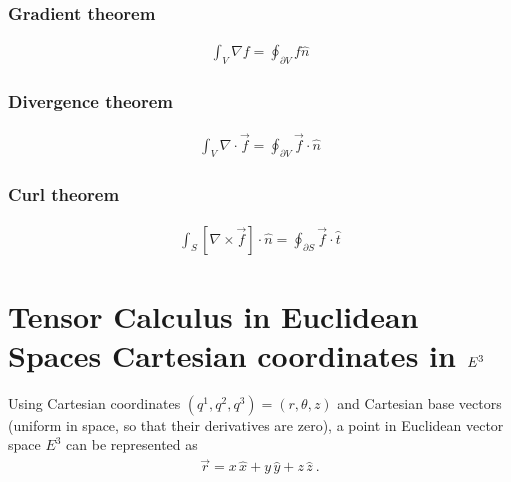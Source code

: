\documentclass[letterpaper,10pt,english]{jupyterBook}
\begin{document}
\subsubsection{Gradient theorem}
\label{\detokenize{ch/tensor-algebra-calculus/calculus-euclidean:gradient-theorem}}\label{\detokenize{ch/tensor-algebra-calculus/calculus-euclidean:tensor-calculus-integrals-theorems-gradient}}\begin{equation*}
\begin{split}\int_{V} \nabla f = \oint_{\partial V} f \hat{n}\end{split}
\end{equation*}

\subsubsection{Divergence theorem}
\label{\detokenize{ch/tensor-algebra-calculus/calculus-euclidean:divergence-theorem}}\label{\detokenize{ch/tensor-algebra-calculus/calculus-euclidean:tensor-calculus-integrals-theorems-divergence}}\begin{equation*}
\begin{split}\int_{V} \nabla \cdot \vec{f} = \oint_{\partial V} \vec{f} \cdot \hat{n}\end{split}
\end{equation*}

\subsubsection{Curl theorem}
\label{\detokenize{ch/tensor-algebra-calculus/calculus-euclidean:curl-theorem}}\label{\detokenize{ch/tensor-algebra-calculus/calculus-euclidean:tensor-calculus-integrals-theorems-curl}}\begin{equation*}
\begin{split}\int_{S} \left[ \nabla \times \vec{f} \right] \cdot \hat{n} = \oint_{\partial S} \vec{f} \cdot \hat{t}\end{split}
\end{equation*}
\sphinxstepscope


\section{Tensor Calculus in Euclidean Spaces \sphinxhyphen{} Cartesian coordinates in \protect\(E^3\protect\)}
\label{\detokenize{ch/tensor-algebra-calculus/calculus-euclidean-cartesian:tensor-calculus-in-euclidean-spaces-cartesian-coordinates-in-e-3}}\label{\detokenize{ch/tensor-algebra-calculus/calculus-euclidean-cartesian:tensor-calculus-cartesian}}\label{\detokenize{ch/tensor-algebra-calculus/calculus-euclidean-cartesian::doc}}
\sphinxAtStartPar
Using Cartesian coordinates \((q^1, q^2, q^3) = (r, \theta, z)\) and Cartesian base vectors (uniform in space, so that their derivatives are zero), a point in Euclidean vector space \(E^3\) can be represented as
\begin{equation*}
\begin{split}\vec{r} = x \, \hat{x} + y \, \hat{y} + z \, \hat{z} \ .\end{split}
\end{equation*}
\end{document}
